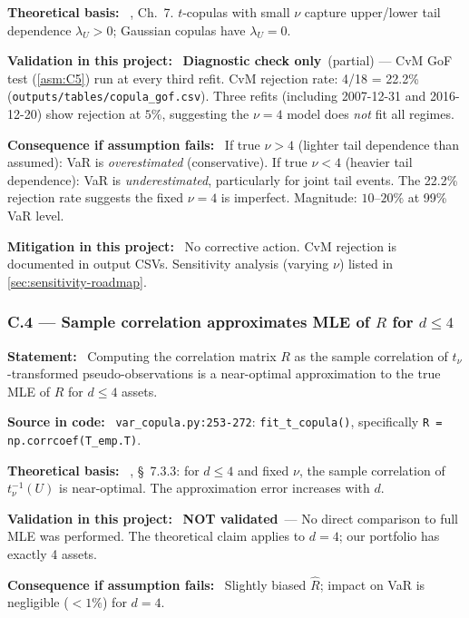 \documentclass[11pt,a4paper]{article}
\newcommand{\asmfield}[1]{\medskip\noindent\textbf{#1:}\ }
\newcommand{\code}[1]{\texttt{#1}}
\newcommand{\diagnostic}{\textbf{Diagnostic check only}}
\newcommand{\notvalidated}{\textbf{NOT validated}}
\begin{document}
\asmfield{Theoretical basis}
\cite{McNeilFreyEmbrechts2005}, Ch.~7. $t$-copulas with small $\nu$ capture
upper/lower tail dependence $\lambda_U > 0$; Gaussian copulas have
$\lambda_U = 0$.

\asmfield{Validation in this project}
\diagnostic\ (partial) --- CvM GoF test (\cref{asm:C5}) run at every third
refit. CvM rejection rate: 4/18 = 22.2\% (\code{outputs/tables/copula\_gof.csv}).
Three refits (including 2007-12-31 and 2016-12-20) show rejection at $5\%$,
suggesting the $\nu = 4$ model does \emph{not} fit all regimes.

\asmfield{Consequence if assumption fails}
If true $\nu > 4$ (lighter tail dependence than assumed): VaR is
\emph{overestimated} (conservative). If true $\nu < 4$ (heavier tail
dependence): VaR is \emph{underestimated}, particularly for joint tail
events. The 22.2\% rejection rate suggests the fixed $\nu = 4$ is
imperfect. Magnitude: $10$--$20\%$ at 99\% VaR level.

\asmfield{Mitigation in this project}
No corrective action. CvM rejection is documented in output CSVs. Sensitivity
analysis (varying $\nu$) listed in \cref{sec:sensitivity-roadmap}.

\subsubsection{C.4 --- Sample correlation approximates MLE of $R$ for $d \le 4$}\label{asm:C4}

\asmfield{Statement}
Computing the correlation matrix $R$ as the sample correlation of
$t_\nu$-transformed pseudo-observations is a near-optimal approximation
to the true MLE of $R$ for $d \le 4$ assets.

\asmfield{Source in code}
\code{var\_copula.py:253-272}: \code{fit\_t\_copula()}, specifically
\lstinline|R = np.corrcoef(T_emp.T)|.

\asmfield{Theoretical basis}
\cite{McNeilFreyEmbrechts2005}, \S~7.3.3: for $d \le 4$ and fixed $\nu$,
the sample correlation of $t^{-1}_\nu(U)$ is near-optimal. The approximation
error increases with $d$.

\asmfield{Validation in this project}
\notvalidated\ --- No direct comparison to full MLE was performed. The
theoretical claim applies to $d = 4$; our portfolio has exactly 4 assets.

\asmfield{Consequence if assumption fails}
Slightly biased $\hat{R}$; impact on VaR is negligible ($< 1\%$) for $d = 4$.
\end{document}
